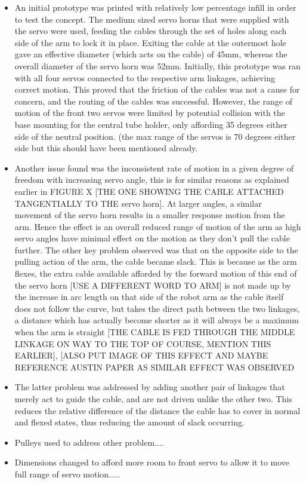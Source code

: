\documentclass[11pt]{article}
\begin{document}
\begin{itemize}
\item{An initial prototype was printed with relatively low percentage infill in order to test the concept. The medium sized servo horns that were supplied with the servo were used, feeding the cables through the set of holes along each side of the arm to lock it in place. Exiting the cable at the outermost hole gave an effective diameter (which acts on the cable) of 45mm, whereas the overall diameter of the servo horn was 52mm. Initially, this prototype was ran with all four servos connected to the respective arm linkages, achieving correct motion. This proved that the friction of the cables was not a cause for concern, and the routing of the cables was successful. However, the range of motion of the front two servos were limited by potential collision with the base mounting for the central tube holder, only affording 35 degrees either side of the neutral position. (the max range of the servos is 70 degrees either side but this should have been mentioned already.}
\item{Another issue found was the inconsistent rate of motion in a given degree of freedom with increasing servo angle, this is for similar reasons as explained earlier in FIGURE X [THE ONE SHOWING THE CABLE ATTACHED TANGENTIALLY TO THE servo horn]. At larger angles, a similar movement of the servo horn results in a smaller response motion from the arm. Hence the effect is an overall reduced range of motion of the arm as high servo angles have minimal effect on the motion as they don't pull the cable further. The other key problem observed was that on the opposite side to the pulling action of the arm, the cable became slack. This is because as the arm flexes, the extra cable available afforded by the forward motion of this end of the servo horn [USE A DIFFERENT WORD TO ARM] is not made up by the increase in arc length on that side of the robot arm  as the cable itself does not follow the curve, but takes the  direct path between the two linkages, a distance which has actually become shorter as it will always be a maximum when the arm is straight [THE CABLE IS FED THROUGH THE MIDDLE LINKAGE ON WAY TO THE TOP OF COURSE, MENTION THIS EARLIER], [ALSO PUT IMAGE OF THIS EFFECT AND MAYBE REFERENCE AUSTIN PAPER AS SIMILAR EFFECT WAS OBSERVED}
\item{The latter problem was addressed by adding another pair of linkages that merely act to guide the cable, and are not driven unlike the other two. This reduces the relative difference of the distance the cable has to cover in normal and flexed states, thus reducing the amount of slack occurring.}
\item{Pulleys used to address other problem....}
\item{Dimensions changed to afford more room to front servo to allow it to move full range of servo motion.....} 
\end{itemize}
\end{document}
